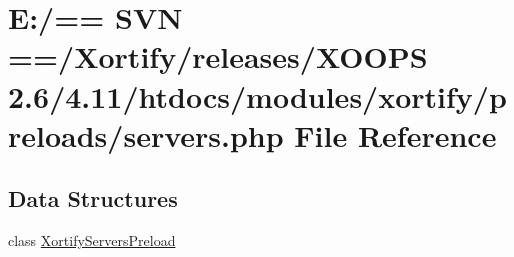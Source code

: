 \hypertarget{preloads_2servers_8php}{\section{E\-:/== S\-V\-N ==/\-Xortify/releases/\-X\-O\-O\-P\-S 2.6/4.11/htdocs/modules/xortify/preloads/servers.php File Reference}
\label{preloads_2servers_8php}
}
\subsection*{Data Structures}
\begin{DoxyCompactItemize}
\item 
class \hyperlink{class_xortify_servers_preload}{Xortify\-Servers\-Preload}
\end{DoxyCompactItemize}
